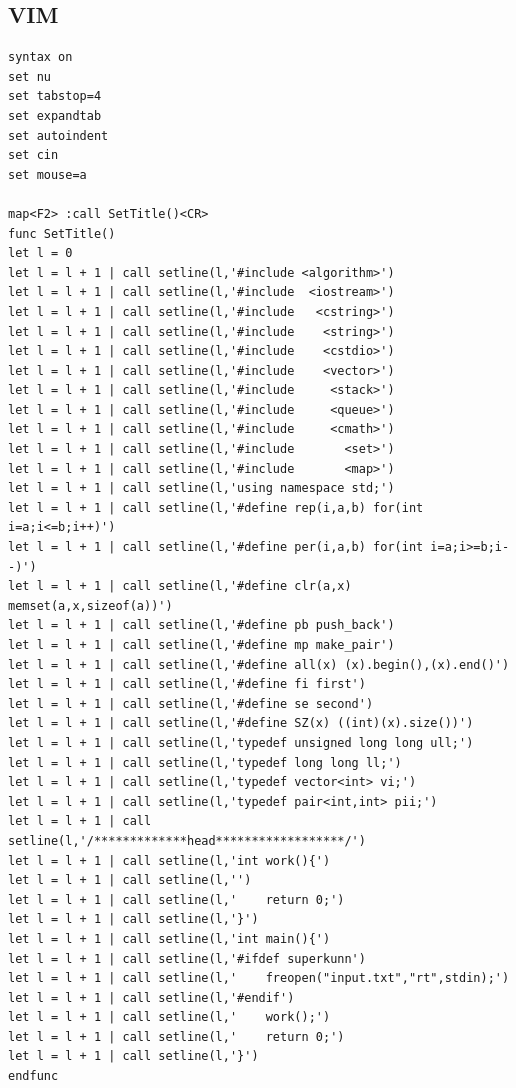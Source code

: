 \documentclass[twoside]{article}
\begin{document}
\subsection{VIM}
\begin{lstlisting}
syntax on
set nu
set tabstop=4
set expandtab
set autoindent
set cin
set mouse=a

map<F2> :call SetTitle()<CR>
func SetTitle()
let l = 0
let l = l + 1 | call setline(l,'#include <algorithm>')
let l = l + 1 | call setline(l,'#include  <iostream>')
let l = l + 1 | call setline(l,'#include   <cstring>')
let l = l + 1 | call setline(l,'#include    <string>')
let l = l + 1 | call setline(l,'#include    <cstdio>')
let l = l + 1 | call setline(l,'#include    <vector>')
let l = l + 1 | call setline(l,'#include     <stack>')
let l = l + 1 | call setline(l,'#include     <queue>')
let l = l + 1 | call setline(l,'#include     <cmath>')
let l = l + 1 | call setline(l,'#include       <set>')
let l = l + 1 | call setline(l,'#include       <map>')
let l = l + 1 | call setline(l,'using namespace std;')
let l = l + 1 | call setline(l,'#define rep(i,a,b) for(int i=a;i<=b;i++)')
let l = l + 1 | call setline(l,'#define per(i,a,b) for(int i=a;i>=b;i--)')
let l = l + 1 | call setline(l,'#define clr(a,x) memset(a,x,sizeof(a))')
let l = l + 1 | call setline(l,'#define pb push_back')
let l = l + 1 | call setline(l,'#define mp make_pair')
let l = l + 1 | call setline(l,'#define all(x) (x).begin(),(x).end()')
let l = l + 1 | call setline(l,'#define fi first')
let l = l + 1 | call setline(l,'#define se second')
let l = l + 1 | call setline(l,'#define SZ(x) ((int)(x).size())')
let l = l + 1 | call setline(l,'typedef unsigned long long ull;')
let l = l + 1 | call setline(l,'typedef long long ll;')
let l = l + 1 | call setline(l,'typedef vector<int> vi;')
let l = l + 1 | call setline(l,'typedef pair<int,int> pii;')
let l = l + 1 | call setline(l,'/*************head******************/')
let l = l + 1 | call setline(l,'int work(){')
let l = l + 1 | call setline(l,'')
let l = l + 1 | call setline(l,'    return 0;')
let l = l + 1 | call setline(l,'}')
let l = l + 1 | call setline(l,'int main(){')
let l = l + 1 | call setline(l,'#ifdef superkunn')
let l = l + 1 | call setline(l,'    freopen("input.txt","rt",stdin);')
let l = l + 1 | call setline(l,'#endif')
let l = l + 1 | call setline(l,'    work();')
let l = l + 1 | call setline(l,'    return 0;')
let l = l + 1 | call setline(l,'}')
endfunc
\end{lstlisting}
\end{document}
